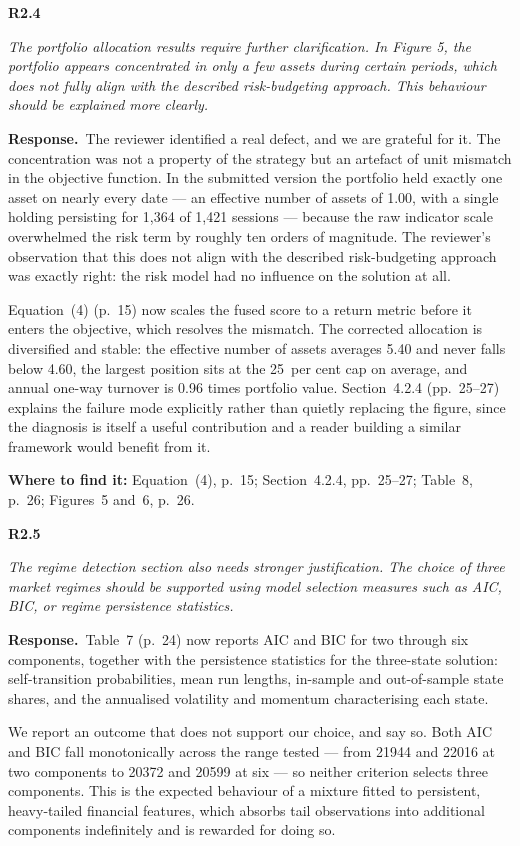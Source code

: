 \documentclass[11pt,a4paper]{article}
\newcommand{\rc}[2]{%
  \par\medskip\noindent
  \colorbox{qbg}{\parbox{\dimexpr\linewidth-2\fboxsep}{%
  \textbf{#1}\par\smallskip\itshape #2}}\par\nopagebreak}
\newcommand{\resp}{\par\medskip\noindent\textbf{Response.}\ }
\newcommand{\where}[1]{\par\smallskip\noindent\textcolor{blue!55!black}{\textbf{Where to find it:} #1}\par}
\begin{document}
\rc{R2.4}{The portfolio allocation results require further clarification. In Figure 5, the
portfolio appears concentrated in only a few assets during certain periods, which does not
fully align with the described risk-budgeting approach. This behaviour should be explained
more clearly.}

\resp The reviewer identified a real defect, and we are grateful for it. The concentration
was not a property of the strategy but an artefact of unit mismatch in the objective
function. In the submitted version the portfolio held exactly one asset on nearly every
date --- an effective number of assets of 1.00, with a single holding persisting for
1{,}364 of 1{,}421 sessions --- because the raw indicator scale overwhelmed the risk term
by roughly ten orders of magnitude. The reviewer's observation that this does not align
with the described risk-budgeting approach was exactly right: the risk model had no
influence on the solution at all.

Equation~(4) (p.~15) now scales the fused score to a return metric before it enters the
objective, which resolves the mismatch. The corrected allocation is diversified and stable:
the effective number of assets averages 5.40 and never falls below 4.60, the largest
position sits at the 25~per cent cap on average, and annual one-way turnover is 0.96 times
portfolio value. Section~4.2.4 (pp.~25--27) explains the failure mode explicitly rather
than quietly replacing the figure, since the diagnosis is itself a useful contribution and
a reader building a similar framework would benefit from it.
\where{Equation~(4), p.~15; Section~4.2.4, pp.~25--27; Table~8, p.~26; Figures~5 and~6, p.~26.}

\rc{R2.5}{The regime detection section also needs stronger justification. The choice of
three market regimes should be supported using model selection measures such as AIC, BIC,
or regime persistence statistics.}

\resp Table~7 (p.~24) now reports AIC and BIC for two through six components, together with
the persistence statistics for the three-state solution: self-transition probabilities,
mean run lengths, in-sample and out-of-sample state shares, and the annualised volatility
and momentum characterising each state.

We report an outcome that does not support our choice, and say so. Both AIC and BIC fall
monotonically across the range tested --- from 21944 and 22016 at two components to 20372
and 20599 at six --- so neither criterion selects three components. This is the expected
behaviour of a mixture fitted to persistent, heavy-tailed financial features, which absorbs
tail observations into additional components indefinitely and is rewarded for doing so.
\end{document}
